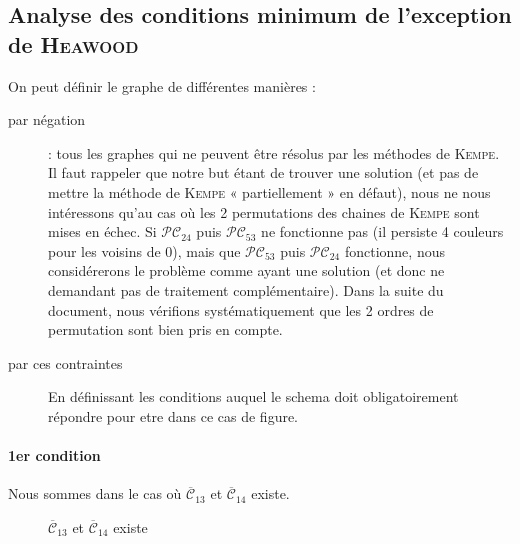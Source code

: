 \subsection{Analyse des conditions minimum de l'exception de \textsc{Heawood}}
On peut définir le graphe de différentes manières :
\begin{description}
\item [par négation] : tous les graphes qui ne peuvent être résolus par les méthodes de \textsc{Kempe}.
Il faut rappeler que notre but étant de trouver une solution (et pas de mettre la méthode de \textsc{Kempe} « partiellement » en défaut), nous ne nous intéressons qu'au cas où les 2 permutations des chaines de \textsc{Kempe} sont mises en échec. Si $\mathcal{PC}_{24}$ puis $\mathcal{PC}_{53}$ ne fonctionne pas (il persiste 4 couleurs pour les voisins de 0), mais que $\mathcal{PC}_{53}$ puis $\mathcal{PC}_{24}$ fonctionne, nous considérerons le problème comme ayant une solution (et donc ne demandant pas de traitement complémentaire). Dans la suite du document, nous vérifions systématiquement que les 2 ordres de permutation sont bien pris en compte.\\
\item[par ces contraintes]
En définissant les conditions auquel le schema doit obligatoirement répondre pour etre dans ce cas de figure.
\end{description}
\paragraph{1er condition}
Nous sommes dans le cas où $\overline{\mathcal{C}}_{13}$ et $\overline{\mathcal{C}}_{14}$ existe.
\begin{figure}[!ht]\centering
	\begin{changemargin}{-3cm}{-3cm}
		\begin{center}
			
			\caption{$\overline{\mathcal{C}}_{13}$ et $\overline{\mathcal{C}}_{14}$ existe}\label{fig:condition1}
		\end{center}
	\end{changemargin}
\end{figure}
\FloatBarrier

